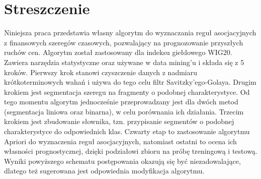 \documentclass[polish, twoside, 12pt, a4paper]{article}
\theoremstyle{definition}
\theoremstyle{plain}
\theoremstyle{remark}
\begin{document}
\clearpage
{}
\listoftables

\clearpage
{}
\listoffigures



\clearpage
{}
\section*{Streszczenie}

Niniejsza praca przedstawia własny algorytm do wyznaczania reguł asocjacyjnych z finansowych szeregów czasowych, pozwalający na prognozowanie przyszłych ruchów cen. Algorytm 
został zastosowany dla indeksu giełdowego WIG20. Zawiera narzędzia statystyczne oraz używane w data mining'u i składa się z 5 kroków. Pierwszy krok stanowi czyszczenie danych z nadmiaru 
krótkoterminowych wahań i używa do tego celu filtr Savitzky'ego-Golaya. Drugim krokiem jest segmentacja szeregu na fragmenty o podobnej charakterystyce. Od tego momentu algorytm 
jednocześnie przeprowadzany jest dla dwóch metod (segmentacja liniowa oraz binarna), w celu porównania ich działania. Trzecim krokiem jest zbudowanie słownika, tzn. przypisanie segmentów o 
podobnej charakterystyce do odpowiednich klas. Czwarty etap to zastosowanie algorytmu Apriori do wyznaczenia reguł asocjacyjnych, natomiast ostatni to ocena ich własności prognostycznej, 
dzięki podziałowi zbioru na próbę treningową i testową. Wyniki powyższego schematu postępowania okazują się być niezadowalające, dlatego też sugerowana jest odpowiednia modyfikacja algorytmu.
\end{document}
